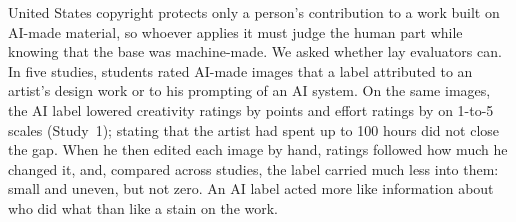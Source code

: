 United States copyright protects only a person's contribution to a work built on AI-made material, so whoever applies it must judge the human part while knowing that the base was machine-made. We asked whether lay evaluators can. In five studies, \NPeople{} students rated AI-made images that a label attributed to an artist's design work or to his prompting of an AI system. On the same images, the AI label lowered creativity ratings by \SOneHOneCreatDiff{} points and effort ratings by \SOneHOneEffDiff{} on 1-to-5 scales (Study~1); stating that the artist had spent up to 100 hours did not close the gap. When he then edited each image by hand, ratings followed how much he changed it, and, compared across studies, the label carried much less into them: small and uneven, but not zero. An AI label acted more like information about who did what than like a stain on the work.
